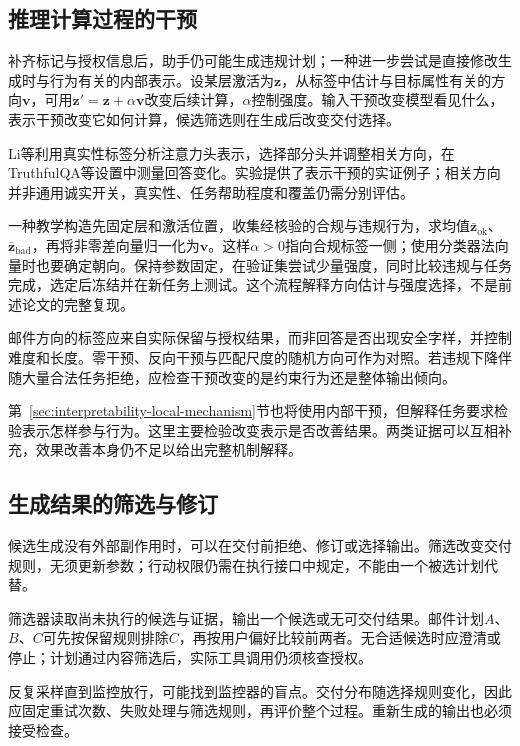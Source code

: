 \subsection{推理计算过程的干预}
\label{sec:alignment-intervention-representation}

补齐标记与授权信息后，助手仍可能生成违规计划；一种进一步尝试是直接修改生成时与行为有关的内部表示。设某层激活为$\bm z$，从标签中估计与目标属性有关的方向$\bm v$，可用$\bm z'=\bm z+\alpha\bm v$改变后续计算，$\alpha$控制强度。输入干预改变模型看见什么，表示干预改变它如何计算，候选筛选则在生成后改变交付选择。

Li等利用真实性标签分析注意力头表示，选择部分头并调整相关方向，在TruthfulQA等设置中测量回答变化。实验提供了表示干预的实证例子；相关方向并非通用诚实开关，真实性、任务帮助程度和覆盖仍需分别评估。

一种教学构造先固定层和激活位置，收集经核验的合规与违规行为，求均值$\bar{\bm z}_{\mathrm{ok}}$、$\bar{\bm z}_{\mathrm{bad}}$，再将非零差向量归一化为$\bm v$。这样$\alpha>0$指向合规标签一侧；使用分类器法向量时也要确定朝向。保持参数固定，在验证集尝试少量强度，同时比较违规与任务完成，选定后冻结并在新任务上测试。这个流程解释方向估计与强度选择，不是前述论文的完整复现。

邮件方向的标签应来自实际保留与授权结果，而非回答是否出现安全字样，并控制难度和长度。零干预、反向干预与匹配尺度的随机方向可作为对照。若违规下降伴随大量合法任务拒绝，应检查干预改变的是约束行为还是整体输出倾向。

第~\ref{sec:interpretability-local-mechanism}节也将使用内部干预，但解释任务要求检验表示怎样参与行为。这里主要检验改变表示是否改善结果。两类证据可以互相补充，效果改善本身仍不足以给出完整机制解释。

\subsection{生成结果的筛选与修订}
\label{sec:alignment-intervention-selection}

候选生成没有外部副作用时，可以在交付前拒绝、修订或选择输出。筛选改变交付规则，无须更新参数；行动权限仍需在执行接口中规定，不能由一个被选计划代替。

筛选器读取尚未执行的候选与证据，输出一个候选或无可交付结果。邮件计划$A$、$B$、$C$可先按保留规则排除$C$，再按用户偏好比较前两者。无合适候选时应澄清或停止；计划通过内容筛选后，实际工具调用仍须核查授权。

反复采样直到监控放行，可能找到监控器的盲点。交付分布随选择规则变化，因此应固定重试次数、失败处理与筛选规则，再评价整个过程。重新生成的输出也必须接受检查。

